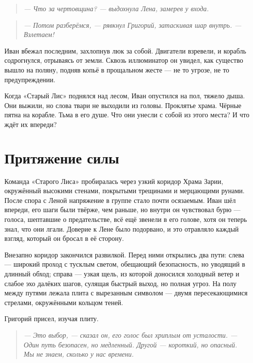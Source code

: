 \documentclass[12pt,a4paper]{book} %
\newenvironment{dialogue}{\begin{quote}\itshape}{\end{quote}}
\begin{document}
\begin{dialogue}
--- Что за чертовщина? --- выдохнула Лена, замерев у входа.
\end{dialogue}

\begin{dialogue}
--- Потом разберёмся, --- рявкнул Григорий, затаскивая шар внутрь. --- Взлетаем!
\end{dialogue}

Иван вбежал последним, захлопнув люк за собой. Двигатели взревели, и корабль содрогнулся, отрываясь от земли. Сквозь иллюминатор он увидел, как существо вышло на поляну, подняв копьё в прощальном жесте --- не то угрозе, не то предупреждении.

Когда «Старый Лис» поднялся над лесом, Иван опустился на пол, тяжело дыша. Они выжили, но слова твари не выходили из головы. Проклятье храма. Чёрные пятна на корабле. Тьма в его душе. Что они унесли с собой из этого места? И что ждёт их впереди?


\chapter{Притяжение силы}

Команда «Старого Лиса» пробиралась через узкий коридор Храма Зарии, окружённый высокими стенами, покрытыми трещинами и мерцающими рунами. После спора с Леной напряжение в группе стало почти осязаемым. Иван шёл впереди, его шаги были твёрже, чем раньше, но внутри он чувствовал бурю --- голоса, шептавшие о предательстве, всё ещё звенели в его голове, хотя он теперь знал, что они лгали. Доверие к Лене было подорвано, и это отравляло каждый взгляд, который он бросал в её сторону.

Внезапно коридор закончился развилкой. Перед ними открылись два пути: слева --- широкий проход с тусклым светом, обещающий безопасность, но уводящий в длинный обход; справа --- узкая щель, из которой доносился холодный ветер и слабое эхо далёких шагов, сулящая быстрый выход, но полная угроз. На полу между путями лежала плита с вырезанным символом --- двумя пересекающимися стрелами, окружёнными кольцом теней.

Григорий присел, изучая плиту.

\begin{dialogue}
--- Это выбор, --- сказал он, его голос был хриплым от усталости. --- Один путь безопасен, но медленный. Другой --- короткий, но опасный. Мы не знаем, сколько у нас времени.
\end{dialogue}
\end{document}
